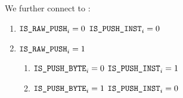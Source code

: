 We further connect \IP{} to \IRP{}:
\begin{enumerate}
    \item \If $\texttt{IS\_RAW\_PUSH} _{i} = 0$ \Then $\texttt{IS\_PUSH\_INST} _{i} = 0$
    \item \If $\texttt{IS\_RAW\_PUSH} _{i} = 1$ \Then
        \begin{enumerate}
            \item \If $\texttt{IS\_PUSH\_BYTE} _{i} = 0$ \Then $\texttt{IS\_PUSH\_INST} _{i} = 1$
            \item \If $\texttt{IS\_PUSH\_BYTE} _{i} = 1$ \Then $\texttt{IS\_PUSH\_INST} _{i} = 0$
        \end{enumerate}
\end{enumerate}
